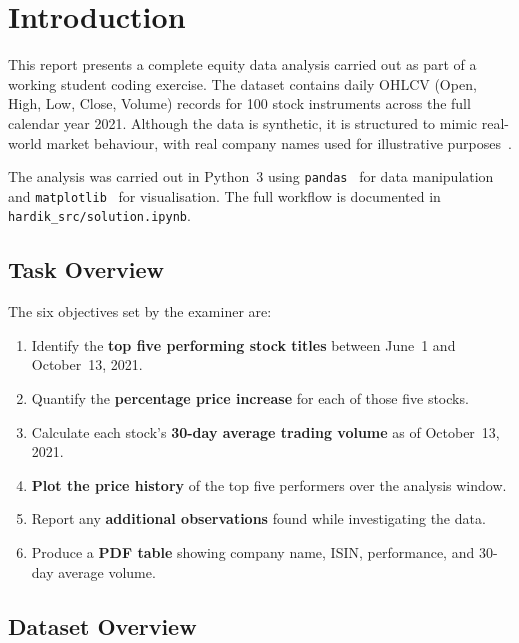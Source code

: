 \chapter{Introduction}
\label{chap:introduction}

This report presents a complete equity data analysis carried out as part of a working student coding exercise. The dataset contains daily OHLCV (Open, High, Low, Close, Volume) records for 100 stock instruments across the full calendar year 2021. Although the data is synthetic, it is structured to mimic real-world market behaviour, with real company names used for illustrative purposes~\cite{ohlcv}.

\medskip
The analysis was carried out in Python~3 using \texttt{pandas}~\cite{pandas} for data manipulation and \texttt{matplotlib}~\cite{matplotlib} for visualisation. The full workflow is documented in \texttt{hardik\_src/solution.ipynb}.

\section{Task Overview}
The six objectives set by the examiner are:

\begin{enumerate}
    \item Identify the \textbf{top five performing stock titles} between June~1 and October~13, 2021.
    \item Quantify the \textbf{percentage price increase} for each of those five stocks.
    \item Calculate each stock's \textbf{30-day average trading volume} as of October~13, 2021.
    \item \textbf{Plot the price history} of the top five performers over the analysis window.
    \item Report any \textbf{additional observations} found while investigating the data.
    \item Produce a \textbf{PDF table} showing company name, ISIN, performance, and 30-day average volume.
\end{enumerate}

\section{Dataset Overview}

